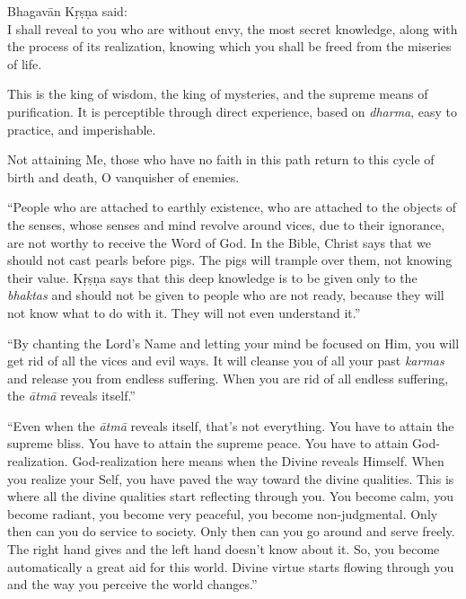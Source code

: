 {\hspace*{1em}Bhagavān Kṛṣṇa said: \\
I shall reveal to you who are without envy, the most secret knowledge, along with the process of its realization, knowing which you shall be freed from the miseries of life.}

{This is the king of wisdom, the king of mysteries, and the supreme means of purification. It is perceptible through direct experience, based on \textit{dharma}, easy to practice, and imperishable.}

{Not attaining Me, those who have no faith in this path return to this cycle of birth and death, O vanquisher of enemies.}

\enquote{People who are attached to earthly existence, who are attached to the objects of the senses, whose senses and mind revolve around vices, due to their ignorance, are not worthy to receive the Word of God. In the Bible, Christ says that we should not cast pearls before pigs. The pigs will trample over them, not knowing their value. Kṛṣṇa says that this deep knowledge is to be given only to the \textit{bhaktas} and should not be given to people who are not ready, because they will not know what to do with it. They will not even understand it.}

\enquote{By chanting the Lord’s Name and letting your mind be focused on Him, you will get rid of all the vices and evil ways. It will cleanse you of all your past \textit{karmas} and release you from endless suffering. When you are rid of all endless suffering, the \textit{ātmā} reveals itself.}

\enquote{Even when the \textit{ātmā} reveals itself, that’s not everything. You have to attain the supreme bliss. You have to attain the supreme peace. You have to attain God-realization. God-realization here means when the Divine reveals Himself. When you realize your Self, you have paved the way toward the divine qualities. This is where all the divine qualities start reflecting through you. You become calm, you become radiant, you become very peaceful, you become non-judgmental. Only then can you do service to society. Only then can you go around and serve freely. The right hand gives and the left hand doesn’t know about it. So, you become automatically a great aid for this world. Divine virtue starts flowing through you and the way you perceive the world changes.}

